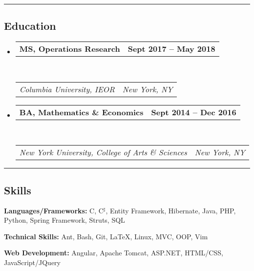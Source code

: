 \documentclass[10.5pt,letterpaper]{article}
\makeatletter
\newcommand{\headerrow}[2]
{\begin{tabular*}{\linewidth}{l@{\extracolsep{\fill}}r}
	#1 &
	#2 \\
\end{tabular*}}
\makeatother
\begin{document}
\hrule
\vspace{-0.4em}

\subsection*{Education}

\begin{itemize}
	\parskip=0.1em

    \item[]
    \headerrow
        {\textbf{MS, Operations Research}}
        {\textbf{Sept 2017 -- May 2018}}
    \\
    \headerrow
        {\emph{Columbia University, IEOR}}
        {\emph{New York, NY}}

    \item[] 
	\headerrow
        {\textbf{BA, Mathematics \& Economics}}
		{\textbf{Sept 2014 -- Dec 2016}}
	\\
	\headerrow
        {\emph{New York University, College of Arts \& Sciences}}
		{\emph{New York, NY}}


\end{itemize}

\hrule
\vspace{-0.4em}
\subsection*{Skills}

\begin{itemize*}
    \item[]
    \textbf{Languages/Frameworks: }C, C$^\sharp$, Entity Framework, Hibernate, Java, PHP, Python, Spring Framework, Struts, SQL
    \vspace{0.2em}

    \item[]
    \textbf{Technical Skills: }Ant, Bash, Git, \LaTeX, Linux, MVC, OOP, Vim

    \vspace{0.2em}

    \item[]
    \textbf{Web Development: }Angular, Apache Tomcat, ASP.NET, HTML/CSS, JavaScript/JQuery
    \vspace{0.2em}

\end{itemize*}
\end{document}
